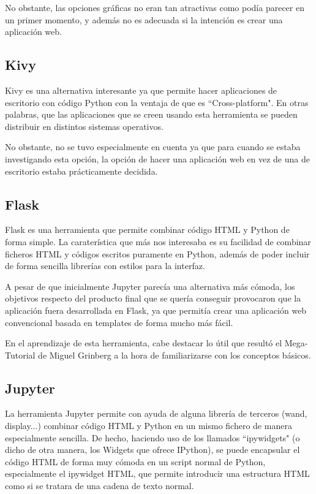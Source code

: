 No obstante, las opciones gráficas no eran tan atractivas como podía parecer en un primer momento, y además no es adecuada si la intención es crear una aplicación web.

\subsection{Kivy}

Kivy \cite{kivy:homepage} es una alternativa interesante ya que permite hacer aplicaciones de escritorio con código Python con la ventaja de que es ``Cross-platform". En otras palabras, que las aplicaciones que se creen usando esta herramienta se pueden distribuir en distintos sistemas operativos. 

No obstante, no se tuvo especialmente en cuenta ya que para cuando se estaba investigando esta opción, la opción de hacer una aplicación web en vez de una de escritorio estaba prácticamente decidida.

\subsection{Flask}

Flask es una herramienta \cite{Grinberg:2014:FWD:2621997} que permite combinar código HTML y Python de forma simple. La caraterística que más nos interesaba es su facilidad de combinar ficheros HTML y códigos escritos puramente en Python, además de poder incluir de forma sencilla librerías con estilos para la interfaz.

A pesar de que inicialmente Jupyter parecía una alternativa más cómoda, los objetivos respecto del producto final que se quería conseguir provocaron que la aplicación fuera desarrollada en Flask, ya que permitía crear una aplicación web convencional basada en templates de forma mucho más fácil.

En el aprendizaje de esta herramienta, cabe destacar lo útil que resultó el Mega-Tutorial de Miguel Grinberg \cite{flaskmegatutorial} a la hora de familiarizarse con los conceptos básicos.


\subsection{Jupyter}

La herramienta Jupyter \cite{PER-GRA:2007} permite con ayuda de alguna librería de terceros (wand, display...) combinar código HTML y Python en un mismo fichero de manera especialmente sencilla. De hecho, haciendo uso de los llamados ``ipywidgets" (o dicho de otra manera, los Widgets que ofrece IPython), se puede encapsular el código HTML de forma muy cómoda en un script normal de Python, especialmente el ipywidget HTML, que permite introducir una estructura HTML como si se tratara de una cadena de texto normal.

